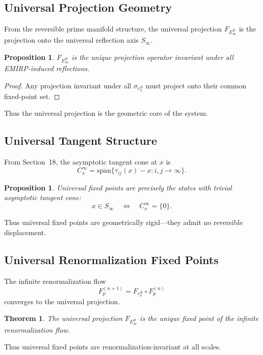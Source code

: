\documentclass[11pt]{article}
\theoremstyle{definition}
\theoremstyle{plain}
\newtheorem{theorem}[definition]{Theorem}
\newtheorem{proposition}[definition]{Proposition}
\theoremstyle{remark}
\begin{document}
\subsection{Universal Projection Geometry}

From the reversible prime manifold structure, the universal projection
$F_{E_\infty^R}$ is the projection onto the universal reflection axis
$S_\infty$.

\begin{proposition}
$F_{E_\infty^R}$ is the unique projection operator invariant under all
EMIRP-induced reflections.
\end{proposition}

\begin{proof}
Any projection invariant under all $\sigma_{e_n^R}$ must project onto
their common fixed-point set.
\end{proof}

Thus the universal projection is the geometric core of the system.

\subsection{Universal Tangent Structure}

From Section~18, the asymptotic tangent cone at $x$ is
\[
C_x^\infty = \overline{\mathrm{span}}\{\tau_{ij}(x) - x : i,j \to \infty\}.
\]

\begin{proposition}
Universal fixed points are precisely the states with trivial asymptotic
tangent cone:
\[
x \in S_\infty \quad \Longleftrightarrow \quad C_x^\infty = \{0\}.
\]
\end{proposition}

Thus universal fixed points are geometrically rigid—they admit no
reversible displacement.

\subsection{Universal Renormalization Fixed Points}

The infinite renormalization flow
\[
F_p^{(n+1)} = F_{e_n^R} \circ F_p^{(n)}
\]
converges to the universal projection.

\begin{theorem}
The universal projection $F_{E_\infty^R}$ is the unique fixed point of
the infinite renormalization flow.
\end{theorem}

Thus universal fixed points are renormalization-invariant at all scales.
\end{document}
